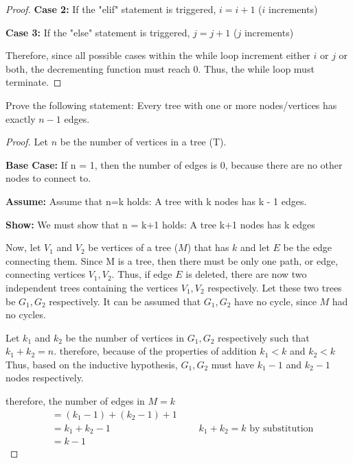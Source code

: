 \documentclass{article}
\begin{document}
\begin{enumerate}
\begin{proof}
        \textbf{Case 2:} If the "elif" statement is triggered, $i = i+1$ ($i$ increments)

        \textbf{Case 3:} If the "else" statement is triggered, $j=j+1$ ($j$ increments)

        \vspace{0.5cm}

        Therefore, since all possible cases within the while loop increment either $i$ or $j$ or both, the decrementing function must reach 0. Thus, the while loop must terminate.
    \end{proof}
\end{enumerate}

\nextprob
Prove the following statement: Every tree with one or more nodes/vertices has
exactly $n-1$ edges.
\begin{proof}
    Let $n$ be the number of vertices in a tree (T).

    \leftskip 1cm 
    
    \textbf{Base Case:} If n = 1, then the number of edges is 0, because there are no other nodes to connect to.
    
    \textbf{Assume:} Assume that n=k holds: A tree with k nodes has k - 1 edges.
    
    \textbf{Show:} We must show that n = k+1 holds: A tree k+1 nodes has k edges

    Now, let $V_1$ and $V_2$ be vertices of a tree ($M$) that has $k$ and let $E$ be the edge connecting them. Since M is a tree,
    then there must be only one path, or edge, connecting vertices $V_1, V_2$. Thus, if edge $E$ is deleted,
    there are now two independent trees containing the vertices $V_1, V_2$ respectively. Let these two trees be $G_1, G_2$ respectively.
    It can be assumed that $G_1, G_2$ have no cycle, since $M$ had no cycles.

    Let $k_1$ and $k_2$ be the number of vertices in $G_1, G_2$ respectively such that $k_1+k_2=n$. therefore, because of the properties of addition
    $k_1 < k$ and $k_2 < k$ Thus, based on the inductive hypothesis, $G_1,G_2$ must have $k_1-1$ and $k_2 - 1$ nodes respectively.
    
    therefore, the number of edges in $M= k$
    \begin{align*}
        &=(k_1-1)+(k_2 - 1) + 1 \\
        &=k_1+k_2 - 1 &&\text{  $k_1+k_2 = k$ by substitution} \\
        &=k-1
    \end{align*}
\end{proof}
\end{document}

